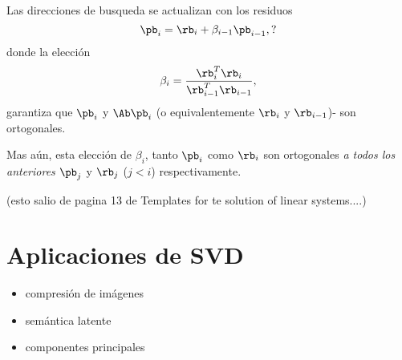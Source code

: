 Las direcciones de busqueda se actualizan con los residuos
$$
\pb_i=\rb_i+\beta_{i-1}\pb_{i-1},?
$$
donde la elección
$$
\beta_{i}=\frac{\rb_{i}^T\rb_{i}}{\rb_{i-1}^T\rb_{i-1}},
$$
garantiza que $\pb_i$ y $\Ab\pb_i$ (o equivalentemente $\rb_i$ y $\rb_{i-1}$)- son ortogonales.

Mas aún, esta elección de $\beta_i$, tanto $\pb_i$ como $\rb_i$ son ortogonales \emph{a todos los anteriores} $\pb_j$ y $\rb_j$ ($j<i$) respectivamente.

(esto salio de pagina 13 de Templates for te solution of linear systems....)


\section{Aplicaciones de SVD}
\begin{itemize}
 \item compresión de imágenes
\item semántica latente
\item componentes principales
\end{itemize}
